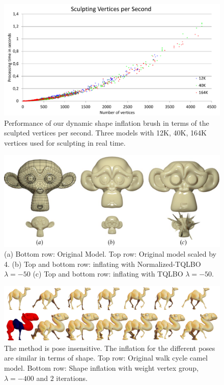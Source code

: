 \documentclass[10pt, conference]{IEEEtran}
\begin{document}
\begin{figure}
\includegraphics[width=1\columnwidth]{figs/verts_per_second_sculpt}

\caption{\label{fig:Performance-sculpt}Performance of our dynamic shape inflation
brush in terms of the sculpted vertices per second. Three models with
12K, 40K, 164K vertices used for sculpting in real time.}
\end{figure}


\begin{figure}
\includegraphics[width=1\columnwidth]{figs/monkey}

\caption{\label{fig:(a)Monkey}(a) Bottom row: Original Model. Top row: Original
model scaled by 4. (b) Top and bottom row: inflating with Normalized-TQLBO
$\lambda=-50$ (c) Top and bottom row: inflating with TQLBO $\lambda=-50$.}
\end{figure}


\begin{figure}[t]
\includegraphics[width=1\textwidth]{figs/camello_walk2}

\caption{\label{fig:Animated_Camell}The method is pose insensitive. The inflation
for the different poses are similar in terms of shape. Top row: Original
walk cycle camel model. Bottom row: Shape inflation with weight
vertex group, $\lambda=-400$ and $2$ iterations. }
\end{figure}
\end{document}
